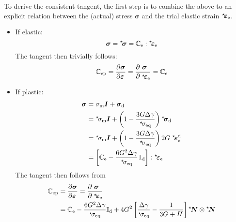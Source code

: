 \documentclass[namecite, fleqn]{goose-article}
\newcommand\leftstar[1]{\hspace*{-.3em}~^\star\!#1}
\begin{document}
To derive the consistent tangent, the first step is to combine the above to an explicit
relation between the (actual) stress $\bm{\sigma}$ and the trial elastic strain
$\leftstar{\bm{\varepsilon}}_\mathrm{e}$.
\begin{itemize}

    \item If elastic:
    \begin{equation}
        \bm{\sigma}
        = \leftstar{\bm{\sigma}}
        = \mathbb{C}_\mathrm{e} : \leftstar{\bm{\varepsilon}}_\mathrm{e}
    \end{equation}
    The tangent then trivially follows:
    \begin{equation}
        \mathbb{C}_\mathrm{ep}
        =
        \frac{
            \partial  \bm{\sigma} \hfill
        }{
            \partial \bm{\varepsilon} \hfill
        }
        =
        \frac{
            \partial ~\bm{\sigma} \hfill
        }{
            \partial \;\leftstar{\bm{\varepsilon}}_\mathrm{e} \hfill
        }
        =
        \mathbb{C}_\mathrm{e}
    \end{equation}

    \item If plastic:
    \begin{align}
        \bm{\sigma}
        &= \sigma_\mathrm{m} \bm{I}
        + \bm{\sigma}_\mathrm{d}
        \\
        &= \leftstar{\sigma}_\mathrm{m} \bm{I}
        + \left( 1- \frac{3 G \Delta \gamma}{\leftstar{\sigma}_\mathrm{eq}} \right)
        \leftstar{\bm{\sigma}}_\mathrm{d}
        \\
        &= \leftstar{\sigma}_\mathrm{m} \bm{I}
        + \left( 1-\frac{3 G \Delta\gamma}{\leftstar{\sigma}_\mathrm{eq}} \right)
        2 G \; \leftstar{\bm{\varepsilon}}_\mathrm{e}^\mathrm{d}
        \\
        &=
        \left[
        \mathbb{C}_\mathrm{e} -
        \frac{6 G^2 \Delta \gamma}{\leftstar{\sigma}_\mathrm{eq}} \, \mathbb{I}_\mathrm{d}
        \right] : \leftstar{\bm{\varepsilon}}_\mathrm{e}
    \end{align}
    The tangent then follows from
    \begin{align}
        \mathbb{C}_\mathrm{ep} &=
        \frac{
            \partial  \bm{\sigma} \hfill
        }{
            \partial \bm{\varepsilon} \hfill
        } =
        \frac{
            \partial ~\bm{\sigma} \hfill
        }{
            \partial \;\leftstar{\bm{\varepsilon}}_\mathrm{e} \hfill
        }
        \\
        &=
        \mathbb{C}_\mathrm{e} -
        \frac{6 G^2 \Delta \gamma}{\leftstar{\sigma}_\mathrm{eq}}
        \mathbb{I}_\mathrm{d}
        + 4 G^2
        \left[
            \frac{\Delta \gamma}{\leftstar{\sigma}_\mathrm{eq}} -
            \frac{1}{3 G + H}
        \right]
        \leftstar{\bm{N}} \otimes \leftstar{\bm{N}}
    \end{align}

\end{itemize}
\end{document}
